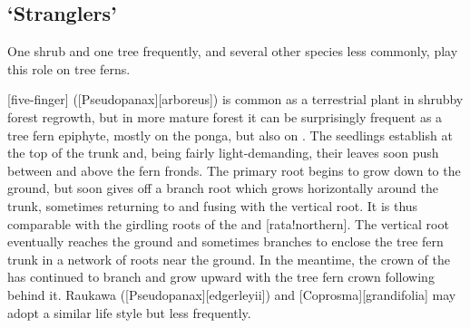 \subsection{`Stranglers'}

One shrub and one tree frequently, and several other species less commonly, play this role on tree ferns.

[five-finger] ([Pseudopanax][arboreus]) is common as a terrestrial plant in shrubby forest regrowth, but in more mature forest it can be surprisingly frequent as a tree fern epiphyte, mostly on the ponga, but also on .
The seedlings establish at the top of the trunk and, being fairly light-demanding, their leaves soon push between and above the fern fronds.
The primary root begins to grow down to the ground, but soon gives off a branch root which grows horizontally around the trunk, sometimes returning to and fusing with the vertical root.
It is thus comparable with the girdling roots of the  and [rata!northern].
The vertical root eventually reaches the ground and sometimes branches to enclose the tree fern trunk in a network of roots near the ground.
In the meantime, the crown of the  has continued to branch and grow upward with the tree fern crown following behind it.
Raukawa ([Pseudopanax][edgerleyii]) and [Coprosma][grandifolia] may adopt a similar life style but less frequently.

